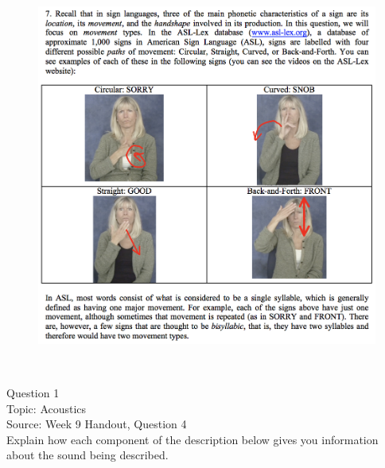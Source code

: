 \documentclass[12pt]{article}
\begin{document}
\begin{figure}[H]
\includegraphics{../images/ASL_movement.png}
\end{figure}

\newpage

\begin{center}
\textbf{{\color{red}{\HUGE END OF EXAM}}}\\

\end{center}
\newpage

\begin{center}
\textbf{{\color{blue}{\HUGE START OF EXAM\\}}}

\textbf{{\color{blue}{\HUGE Student ID: 56051\\}}}

\textbf{{\color{blue}{\HUGE 9:30\\}}}

\end{center}
\newpage

{\large Question 1}\\

Topic: Acoustics\\
Source: Week 9 Handout, Question 4\\

Explain how each component of the description below gives you information about the sound being described.\\
\end{document}
